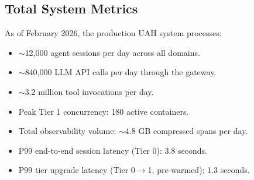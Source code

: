 \subsection{Total System Metrics}

As of February 2026, the production UAH system processes:
\begin{itemize}[leftmargin=1.5em]
    \item $\sim$12,000 agent sessions per day across all domains.
    \item $\sim$840,000 LLM API calls per day through the gateway.
    \item $\sim$3.2 million tool invocations per day.
    \item Peak Tier 1 concurrency: 180 active containers.
    \item Total observability volume: $\sim$4.8 GB compressed spans per day.
    \item P99 end-to-end session latency (Tier 0): 3.8 seconds.
    \item P99 tier upgrade latency (Tier 0$\to$1, pre-warmed): 1.3 seconds.
\end{itemize}

